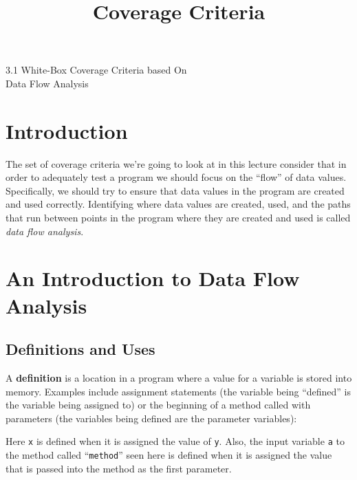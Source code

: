 



\title{Coverage Criteria}{3.1 White-Box Coverage Criteria based On \\ Data Flow Analysis}



\section{Introduction}

The set of coverage criteria we're going to look at in this lecture consider
that in order to adequately test a program we should focus on the ``flow'' of
data values. Specifically, we should try to ensure that data values in the
program are created and used correctly. Identifying where data values are
created, used, and the paths that run between points in the program where they
are created and used is called {\it data flow analysis}. 


\section{An Introduction to Data Flow Analysis}

\subsection{Definitions and Uses}

A {\bf definition} is a location in a program where a value for a variable is
stored into memory. Examples include assignment statements (the variable being
``defined'' is the variable being assigned to) or the beginning of a method called
with parameters (the variables being defined are the parameter variables):

\begin{center} 
\end{center}   


Here {\tt x} is defined when it is assigned the value of {\tt y}. Also, the
input variable {\tt a} to the method called ``{\tt method}'' seen here is
defined when it is assigned the value that is passed into the method as the
first parameter.

